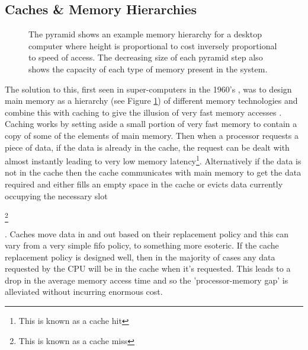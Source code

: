 \subsection{Caches \& Memory Hierarchies}


\begin{figure}
	
	\caption[Memory Hierarchy]{The pyramid shows an example memory hierarchy for a desktop computer where height is proportional to cost inversely proportional to speed of access. The decreasing size of each pyramid step also shows the capacity of each type of memory present in the system.}
	\label{fig:hierarchy}
\end{figure}

The solution to this, first seen in super-computers in the 1960's \cite{pattersonComputerOrganizationDesign2018}, was to design main memory as a hierarchy (see Figure \ref{fig:hierarchy}) of different memory technologies \cite{wilkesSlaveMemoriesDynamic1965} and combine this with caching to give the illusion of very fast memory accesses \cite{smithCacheMemories1982}. Caching works by setting aside a small portion of very fast memory to contain a copy of some of the elements of main memory. Then when a processor requests a piece of data, if the data is already in the cache, the request can be dealt with almost instantly leading to very low memory latency\footnote{This is known as a cache hit}. Alternatively if the data is not in the cache then the cache communicates with main memory to get the data required and either fills an empty space in the cache or evicts data currently occupying the necessary slot \begin{NoHyper}\footnote{This is known as a cache miss}\end{NoHyper}. Caches move data in and out based on their replacement policy and this can vary from a very simple \gls{fifo} policy, to something more esoteric\cite{al-zoubiPerformanceEvaluationCache2004}. If the cache replacement policy is designed well,  then in the majority of cases any data requested by the CPU will be in the cache when it's requested. This leads to a drop in the average memory access time and so the 'processor-memory gap' is alleviated without incurring enormous cost.

